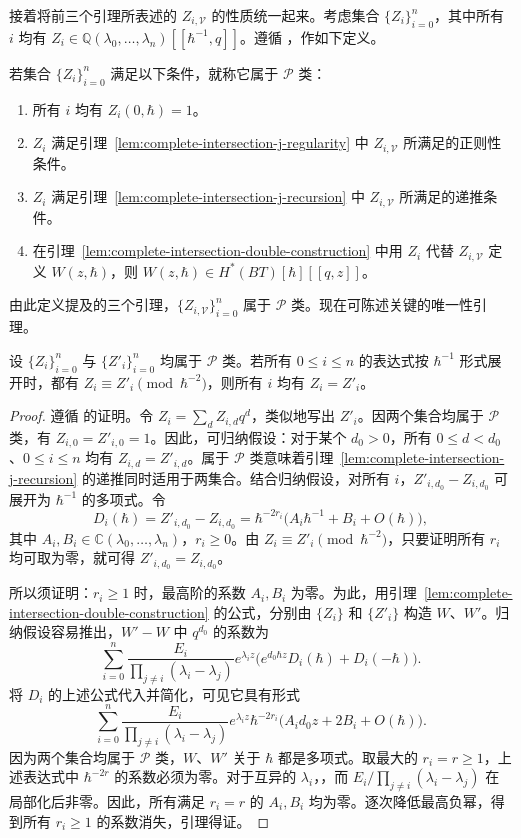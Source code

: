 接着将前三个引理所表述的 $Z_{i,\mathcal V}$ 的性质统一起来。考虑集合 $\{Z_i\}_{i=0}^n$，其中所有 $i$ 均有 $Z_i\in\mathbb Q(\lambda_0,\ldots,\lambda_n)[[\hbar^{-1},q]]$。遵循 ，作如下定义。
\begin{definition}\label{def:complete-intersection-class-p}
若集合 $\{Z_i\}_{i=0}^n$ 满足以下条件，就称它属于 $\mathcal P$ 类：
\begin{enumerate}[label=(\roman*)]
\item 所有 $i$ 均有 $Z_i(0,\hbar)=1$。
\item $Z_i$ 满足引理~\ref{lem:complete-intersection-j-regularity} 中 $Z_{i,\mathcal V}$ 所满足的正则性条件。
\item $Z_i$ 满足引理~\ref{lem:complete-intersection-j-recursion} 中 $Z_{i,\mathcal V}$ 所满足的递推条件。
\item 在引理~\ref{lem:complete-intersection-double-construction} 中用 $Z_i$ 代替 $Z_{i,\mathcal V}$ 定义 $W(z,\hbar)$，则 $W(z,\hbar)\in H^*(BT)[\hbar][[q,z]]$。
\end{enumerate}
\end{definition}
由此定义提及的三个引理，$\{Z_{i,\mathcal V}\}_{i=0}^n$ 属于 $\mathcal P$ 类。现在可陈述关键的唯一性引理。
\begin{lemma}[唯一性引理]\label{lem:complete-intersection-j-uniqueness}
设 $\{Z_i\}_{i=0}^n$ 与 $\{Z'_i\}_{i=0}^n$ 均属于 $\mathcal P$ 类。若所有 $0\le i\le n$ 的表达式按 $\hbar^{-1}$ 形式展开时，都有 $Z_i\equiv Z'_i\pmod{\hbar^{-2}}$，则所有 $i$ 均有 $Z_i=Z'_i$。
\end{lemma}
\begin{proof}
遵循  的证明。令 $Z_i=\sum_d Z_{i,d}q^d$，类似地写出 $Z'_i$。因两个集合均属于 $\mathcal P$ 类，有 $Z_{i,0}=Z'_{i,0}=1$。因此，可归纳假设：对于某个 $d_0>0$，所有 $0\le d<d_0$、$0\le i\le n$ 均有 $Z_{i,d}=Z'_{i,d}$。属于 $\mathcal P$ 类意味着引理~\ref{lem:complete-intersection-j-recursion} 的递推同时适用于两集合。结合归纳假设，对所有 $i$，$Z'_{i,d_0}-Z_{i,d_0}$ 可展开为 $\hbar^{-1}$ 的多项式。令
\[
D_i(\hbar)=Z'_{i,d_0}-Z_{i,d_0}=\hbar^{-2r_i}\bigl(A_i\hbar^{-1}+B_i+O(\hbar)\bigr),
\]
其中 $A_i,B_i\in\mathbb C(\lambda_0,\ldots,\lambda_n)$，$r_i\ge0$。由 $Z_i\equiv Z'_i\pmod{\hbar^{-2}}$，只要证明所有 $r_i$ 均可取为零，就可得 $Z'_{i,d_0}=Z_{i,d_0}$。

所以须证明：$r_i\ge1$ 时，最高阶的系数 $A_i,B_i$ 为零。为此，用引理~\ref{lem:complete-intersection-double-construction} 的公式，分别由 $\{Z_i\}$ 和 $\{Z'_i\}$ 构造 $W$、$W'$。归纳假设容易推出，$W'-W$ 中 $q^{d_0}$ 的系数为
\[
\sum_{i=0}^n\frac{E_i}{\prod_{j\ne i}(\lambda_i-\lambda_j)}e^{\lambda_i z}
\bigl(e^{d_0\hbar z}D_i(\hbar)+D_i(-\hbar)\bigr).
\]
将 $D_i$ 的上述公式代入并简化，可见它具有形式
\[
\sum_{i=0}^n\frac{E_i}{\prod_{j\ne i}(\lambda_i-\lambda_j)}e^{\lambda_i z}
\hbar^{-2r_i}\bigl(A_id_0z+2B_i+O(\hbar)\bigr).
\]
因为两个集合均属于 $\mathcal P$ 类，$W$、$W'$ 关于 $\hbar$ 都是多项式。取最大的 $r_i=r\ge1$，上述表达式中 $\hbar^{-2r}$ 的系数必须为零。对于互异的 $\lambda_i$，，而 $E_i/\prod_{j\ne i}(\lambda_i-\lambda_j)$ 在局部化后非零。因此，所有满足 $r_i=r$ 的 $A_i,B_i$ 均为零。逐次降低最高负幂，得到所有 $r_i\ge1$ 的系数消失，引理得证。
\end{proof}

